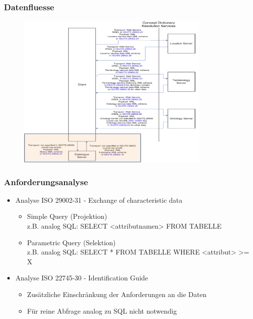 \documentclass[serif,mathserif]{beamer}
\begin{document}
\begin{frame}
  \frametitle{Datenfluesse}

  \begin{figure}[t]
    \includegraphics[width=9.5cm]{images/datenfluesse_plib.png}
  \end{figure}
\end{frame}


\begin{frame}
  \frametitle{Anforderungsanalyse}
  \begin{itemize}
  \item Analyse ISO 29002-31 - Exchange of characteristic data
    \begin{itemize}
    \item Simple Query (Projektion) \\ z.B. analog SQL: SELECT <attributnamen> FROM TABELLE
    \item Parametric Query (Selektion) \\ z.B. analog SQL: SELECT * FROM TABELLE WHERE <attribut> >= X
    \end{itemize}
  \item Analyse ISO 22745-30 - Identification Guide
    \begin{itemize}
    \item Zusätzliche Einschränkung der Anforderungen an die Daten
    \item Für reine Abfrage analog zu SQL nicht notwendig
    \end{itemize}  
  \end{itemize}
\end{frame}
\end{document}
